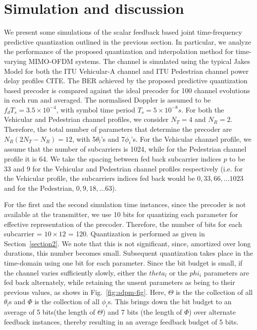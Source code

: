 \documentclass[conference]{IEEEtran}
\begin{document}
\section{Simulation and discussion}
\label{section3}
We present some simulations of the scalar feedback based joint
time-frequency predictive quantization outlined in the previous
section. In particular, we analyze the performance of the proposed
quantization and interpolation method for time-varying MIMO-OFDM
systems. The channel is simulated using the typical Jakes Model for
both the ITU Vehicular-A channel and ITU Pedestrian channel power
delay profiles CITE. The BER achieved by the proposed predictive
quantization based precoder is compared against the ideal precoder for
100 channel evolutions in each run and averaged. The normalised
Doppler is assumed to be $f_dT_s = 3.5\times10^{-4}$, with symbol time
period $T_s = 5\times10^{-8} s$. For both the Vehicular and Pedestrian
channel profiles, we consider $N_T=4$ and $N_R=2$. Therefore, the
total number of parameters that determine the precoder are
$N_{R}(2N_{T} - N_{R}) = 12$, with 5$\theta_l$'s and
7$\phi_i$'s. For the Vehicular channel profile, we assume that the
number of subcarriers is 1024, while for the Pedestrian channel
profile it is 64. We take the spacing between fed back subcarrier
indices $p$ to be $33$ and $9$ for the Vehicular
and Pedestrian channel profiles respectively (i.e. for the Vehicular
profile, the subcarriers indices fed back would be $0, 33, 66, \ldots
1023$ and for the Pedestrian, $0, 9, 18, \ldots 63$).

For the first and the second simulation time instances, since the
precoder is not available at the transmitter, we use 10 bits for
quantizing each parameter for effective representation of the
precoder. Therefore, the number of bits for each subcarrier =
$10\times12$ = 120. Quantization is performed as given in
Section~\ref{section2}. We note that this is not significant, since,
amortized over long durations, this number becomes small. Subsequent
quantization takes place in the time-domain using one bit for each
parameter. Since the bit budget is small, if the channel varies
sufficiently slowly, either the $theta_l$ or the $phi_i$ parameters
are fed back alternately, while retaining the unsent parameters as
being to their previous values, as shows in
Fig.~\ref{fig:adpm-fig}. Here, $\Theta$ is the the collection of all
$\theta_l$s and $\Phi$ is the collection of all $\phi_i$s. This brings
down the bit budget to an average of 5 bits(the length of $\Theta$)
and 7 bits (the length of $\Phi$) over alternate feedback instances,
thereby resulting in an average feedback budget of 5 bits.
\end{document}
